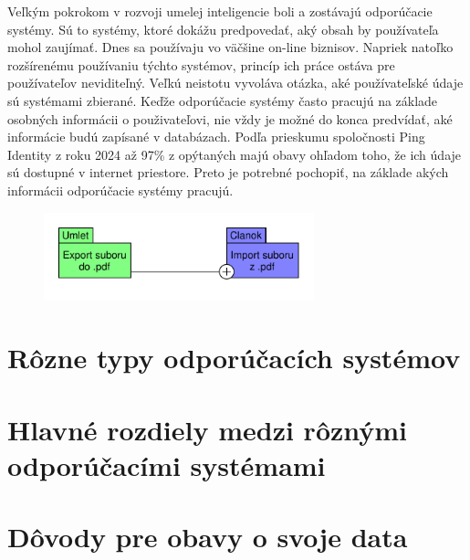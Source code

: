 \documentclass[10pt,twocolumn,twoside,slovak,a4paper]{article}
\begin{document}
Veľkým pokrokom v rozvoji umelej inteligencie boli a zostávajú odporúčacie systémy. Sú to systémy, ktoré dokážu predpovedať, aký obsah by používateľa mohol zaujímať. Dnes sa používaju vo väčšine on-line biznisov. Napriek natoľko rozšírenému používaniu týchto systémov, princíp ich práce ostáva pre používateľov neviditeľný. Veľkú neistotu vyvoláva otázka, aké používateľské údaje sú systémami zbierané. Keďže odporúčacie systémy často pracujú na základe osobných informácii o použivateľovi, nie vždy je možné do konca predvídať, aké informácie budú zapísané v databázach. Podľa prieskumu spoločnosti Ping Identity z roku 2024 až 97\% z opýtaných majú obavy ohľadom toho, že ich údaje sú dostupné v internet priestore\cite{Ping:Fear}. Preto je potrebné pochopiť, na základe akých informácii odporúčacie systémy pracujú. 


\begin{figure}
\centering
\includegraphics[height =1in,width=\textwidth]{diagram_3.pdf}
\end{figure}


\section{Rôzne typy odporúčacích systémov}

\section{Hlavné rozdiely medzi rôznými odporúčacími systémami}

\section{Dôvody pre obavy o svoje data}


\end{document}
